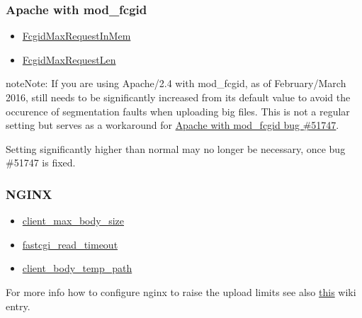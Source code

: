 \documentclass[letterpaper,10pt,english]{sphinxmanual}
\begin{document}
\subsubsection{Apache with mod\_fcgid}
\label{configuration_files/big_file_upload_configuration:apache-with-mod-fcgid}\begin{itemize}
\item {} 
\href{https://httpd.apache.org/mod\_fcgid/mod/mod\_fcgid.html\#fcgidmaxrequestinmem}{FcgidMaxRequestInMem}

\item {} 
\href{https://httpd.apache.org/mod\_fcgid/mod/mod\_fcgid.html\#fcgidmaxrequestlen}{FcgidMaxRequestLen}

\end{itemize}

\begin{notice}{note}{Note:}
If you are using Apache/2.4 with mod\_fcgid, as of February/March 2016,
 still needs to be significantly increased from its default value
to avoid the occurence of segmentation faults when uploading big files. This is not a regular
setting but serves as a workaround for \href{https://bz.apache.org/bugzilla/show\_bug.cgi?id=51747}{Apache with mod\_fcgid bug \#51747}.

Setting  significantly higher than normal may no longer be
necessary, once bug \#51747 is fixed.
\end{notice}


\subsubsection{NGINX}
\label{configuration_files/big_file_upload_configuration:nginx}\begin{itemize}
\item {} 
\href{http://nginx.org/en/docs/http/ngx\_http\_core\_module.html\#client\_max\_body\_size}{client\_max\_body\_size}

\item {} 
\href{http://nginx.org/en/docs/http/ngx\_http\_fastcgi\_module.html\#fastcgi\_read\_timeout}{fastcgi\_read\_timeout}

\item {} 
\href{http://nginx.org/en/docs/http/ngx\_http\_core\_module.html\#client\_body\_temp\_path}{client\_body\_temp\_path}

\end{itemize}

For more info how to configure nginx to raise the upload limits see also \href{https://github.com/owncloud/documentation/wiki/Uploading-files-up-to-16GB\#configuring-nginx}{this}
wiki entry.
\end{document}
